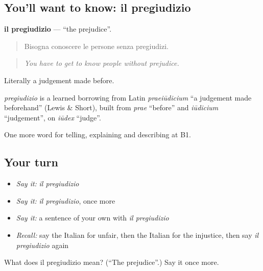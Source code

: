 \subsection*{You'll want to know: il pregiudizio}
\textbf{il pregiudizio} — \textquotedblleft{}the prejudice\textquotedblright{}.

\begin{quote}
Bisogna conoscere le persone senza pregiudizi.
\end{quote}

\begin{quote}
\emph{You have to get to know people without prejudice.}
\end{quote}

Literally a judgement made before.

\begin{cousinweb}
\emph{pregiudizio} is a learned borrowing from Latin \emph{praeiūdicium} \textquotedblleft{}a judgement made beforehand\textquotedblright{} (Lewis \& Short), built from \emph{prae} \textquotedblleft{}before\textquotedblright{} and \emph{iūdicium} \textquotedblleft{}judgement\textquotedblright{}, on \emph{iūdex} \textquotedblleft{}judge\textquotedblright{}.
\end{cousinweb}

\begin{grammarlens}[title={What you've built}]
One more word for telling, explaining and describing at B1.
\end{grammarlens}

\subsection*{Your turn}
\begin{itemize}
\raggedright
  \item \emph{Say it:} \emph{il pregiudizio}
  \item \emph{Say it:} \emph{il pregiudizio}, once more
  \item \emph{Say it:} a sentence of your own with \emph{il pregiudizio}
  \item \emph{Recall:} say the Italian for unfair, then the Italian for the injustice, then say \emph{il pregiudizio} again
\end{itemize}

\begin{tcolorbox}[breakable,colback=teal!4,colframe=teal!35!black,title={Before you move on}]
What does il pregiudizio mean? (\textquotedblleft{}The prejudice\textquotedblright{}.) Say it once more.
\end{tcolorbox}
